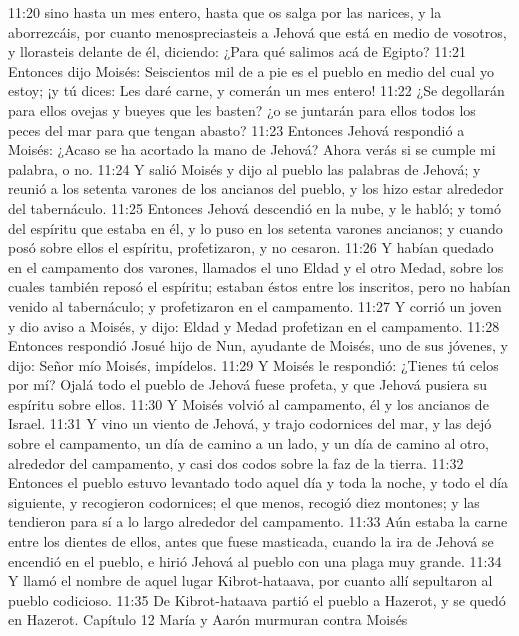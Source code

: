 11:20 sino hasta un mes entero, hasta que os salga por las narices, y la aborrezcáis, por cuanto menospreciasteis a Jehová que está en medio de vosotros, y llorasteis delante de él, diciendo: ¿Para qué salimos acá de Egipto?  
11:21 Entonces dijo Moisés: Seiscientos mil de a pie es el pueblo en medio del cual yo estoy; ¡y tú dices: Les daré carne, y comerán un mes entero!  
11:22 ¿Se degollarán para ellos ovejas y bueyes que les basten? ¿o se juntarán para ellos todos los peces del mar para que tengan abasto?  
11:23 Entonces Jehová respondió a Moisés: ¿Acaso se ha acortado la mano de Jehová? Ahora verás si se cumple mi palabra, o no.  
11:24 Y salió Moisés y dijo al pueblo las palabras de Jehová; y reunió a los setenta varones de los ancianos del pueblo, y los hizo estar alrededor del tabernáculo.  
11:25 Entonces Jehová descendió en la nube, y le habló; y tomó del espíritu que estaba en él, y lo puso en los setenta varones ancianos; y cuando posó sobre ellos el espíritu, profetizaron, y no cesaron.  
11:26 Y habían quedado en el campamento dos varones, llamados el uno Eldad y el otro Medad, sobre los cuales también reposó el espíritu; estaban éstos entre los inscritos, pero no habían venido al tabernáculo; y profetizaron en el campamento.  
11:27 Y corrió un joven y dio aviso a Moisés, y dijo: Eldad y Medad profetizan en el campamento.  
11:28 Entonces respondió Josué hijo de Nun, ayudante de Moisés, uno de sus jóvenes, y dijo: Señor mío Moisés, impídelos.  
11:29 Y Moisés le respondió: ¿Tienes tú celos por mí? Ojalá todo el pueblo de Jehová fuese profeta, y que Jehová pusiera su espíritu sobre ellos.  
11:30 Y Moisés volvió al campamento, él y los ancianos de Israel.  
11:31 Y vino un viento de Jehová, y trajo codornices del mar, y las dejó sobre el campamento, un día de camino a un lado, y un día de camino al otro, alrededor del campamento, y casi dos codos   sobre la faz de la tierra. 
11:32 Entonces el pueblo estuvo levantado todo aquel día y toda la noche, y todo el día siguiente, y recogieron codornices; el que menos, recogió diez montones; y las tendieron para sí a lo largo alrededor del campamento.  
11:33 Aún estaba la carne entre los dientes de ellos, antes que fuese masticada, cuando la ira de Jehová se encendió en el pueblo, e hirió Jehová al pueblo con una plaga muy grande.  
11:34 Y llamó el nombre de aquel lugar Kibrot-hataava, por cuanto allí sepultaron al pueblo codicioso.  
11:35 De Kibrot-hataava partió el pueblo a Hazerot, y se quedó en Hazerot.  
Capítulo 12
María y Aarón murmuran contra Moisés  

